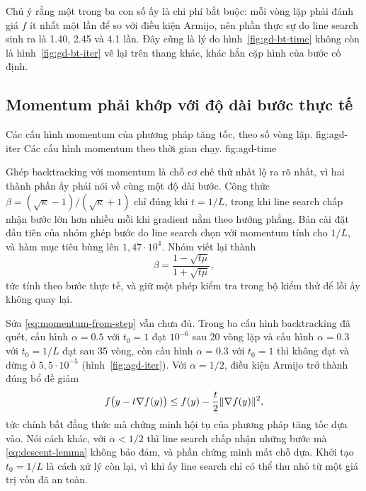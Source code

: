 Chú ý rằng một trong ba con số ấy là chi phí bắt buộc: mỗi vòng lặp phải đánh giá
$f$ ít nhất một lần để so với điều kiện Armijo, nên phần thực sự do line search
sinh ra là \num{1.40}, \num{2.45} và \num{4.1} lần. Đây cũng là lý do
hình~\ref{fig:gd-bt-time} không còn là hình~\ref{fig:gd-bt-iter} vẽ lại trên
thang khác, khác hẳn cặp hình của bước cố định.

\subsection{Momentum phải khớp với độ dài bước thực tế}
\label{sec:mech-momentum}

  {Các cấu hình momentum của phương pháp tăng tốc, theo số vòng lặp.}
  {fig:agd-iter}
  {Các cấu hình momentum theo thời gian chạy.}
  {fig:agd-time}

Ghép backtracking với momentum là chỗ cơ chế thứ nhất lộ ra rõ nhất, vì hai thành
phần ấy phải nói về cùng một độ dài bước. Công thức
$\beta = (\sqrt{\kappa}-1)/(\sqrt{\kappa}+1)$ chỉ đúng khi $t = 1/L$, trong khi
line search chấp nhận bước lớn hơn nhiều mỗi khi gradient nằm theo hướng phẳng.
Bản cài đặt đầu tiên của nhóm ghép bước do line search chọn với momentum tính cho
$1/L$, và hàm mục tiêu bùng lên $1{,}47 \cdot 10^{4}$. Nhóm viết lại thành
%
\begin{equation}
  \label{eq:momentum-from-step}
  \beta = \frac{1 - \sqrt{t\mu}}{1 + \sqrt{t\mu}} ,
\end{equation}
%
tức tính theo bước thực tế, và giữ một phép kiểm tra trong bộ kiểm thử để lỗi ấy
không quay lại.

Sửa \eqref{eq:momentum-from-step} vẫn chưa đủ. Trong ba cấu hình backtracking đã
quét, cấu hình $\alpha = 0.5$ với $t_0 = 1$ đạt $10^{-6}$ sau 20 vòng lặp và cấu
hình $\alpha = 0.3$ với $t_0 = 1/L$ đạt sau 35 vòng, còn cấu hình $\alpha = 0.3$
với $t_0 = 1$ thì không đạt và dừng ở $5{,}5 \cdot 10^{-5}$
(hình~\ref{fig:agd-iter}). Với $\alpha = 1/2$, điều kiện Armijo trở thành đúng bổ
đề giảm
%
\begin{equation}
  \label{eq:descent-lemma}
  f\bigl(y - t \nabla f(y)\bigr) \le f(y) - \frac{t}{2} \lVert\nabla f(y)\rVert^{2} ,
\end{equation}
%
tức chính bất đẳng thức mà chứng minh hội tụ của phương pháp tăng tốc dựa vào.
Nói cách khác, với $\alpha < 1/2$ thì line search chấp nhận những bước mà
\eqref{eq:descent-lemma} không bảo đảm, và phần chứng minh mất chỗ dựa. Khởi tạo
$t_0 = 1/L$ là cách xử lý còn lại, vì khi ấy line search chỉ có thể thu nhỏ từ một
giá trị vốn đã an toàn.

